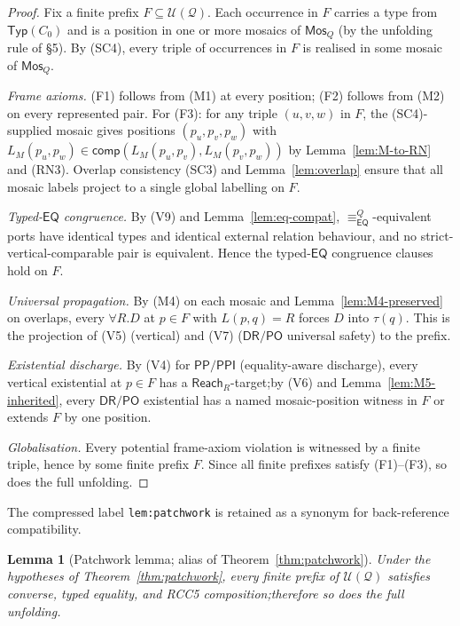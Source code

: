 \documentclass[11pt]{article}
\newtheorem{lemma}[theorem]{Lemma}
\newcommand{\EQ}{\mathsf{EQ}}
\newcommand{\DR}{\mathsf{DR}}
\newcommand{\PO}{\mathsf{PO}}
\newcommand{\PP}{\mathsf{PP}}
\newcommand{\PPI}{\mathsf{PPI}}
\newcommand{\comp}{\mathsf{comp}}
\newcommand{\Typ}{\mathsf{Typ}}
\newcommand{\Q}{\mathcal Q}
\newcommand{\U}{\mathcal U}
\newcommand{\Mos}{\mathsf{Mos}}
\newcommand{\Reach}{\mathrel{\mathsf{Reach}}}
\newcommand{\eqc}{\equiv_{\EQ}}
\begin{document}
\begin{proof}
Fix a finite prefix $F\subseteq\U(\Q)$.  Each occurrence in $F$
carries a type from $\Typ(C_0)$ and is a position in one or more
mosaics of $\Mos_Q$ (by the unfolding rule of \S5).  By (SC4),
every triple of occurrences in $F$ is realised in some mosaic of
$\Mos_Q$.

\emph{Frame axioms.}  (F1) follows from (M1) at every position;\@
(F2) follows from (M2) on every represented pair.  For (F3): for any
triple $(u,v,w)$ in $F$, the (SC4)-supplied mosaic gives positions
$(p_u,p_v,p_w)$ with
$L_M(p_u,p_w)\in\comp(L_M(p_u,p_v),L_M(p_v,p_w))$ by
Lemma~\ref{lem:M-to-RN} and (RN3).  Overlap consistency (SC3) and
Lemma~\ref{lem:overlap} ensure that all mosaic labels project to a
single global labelling on $F$.

\emph{Typed-$\EQ$ congruence.}  By (V9) and
Lemma~\ref{lem:eq-compat}, $\eqc^{Q}$-equivalent ports have
identical types and identical external relation behaviour, and no
strict-vertical-comparable pair is equivalent.  Hence the typed-$\EQ$
congruence clauses hold on $F$.

\emph{Universal propagation.}  By (M4) on each mosaic and
Lemma~\ref{lem:M4-preserved} on overlaps, every $\forall R.D$ at
$p\in F$ with $L(p,q)=R$ forces $D$ into $\tau(q)$.  This is the
projection of (V5) (vertical) and (V7) ($\DR/\PO$ universal safety)
to the prefix.

\emph{Existential discharge.}  By (V4) for $\PP/\PPI$ (equality-aware
discharge), every vertical existential at $p\in F$ has a
$\Reach_R$-target;\@ by (V6) and Lemma~\ref{lem:M5-inherited}, every
$\DR/\PO$ existential has a named mosaic-position witness in $F$ or
extends $F$ by one position.

\emph{Globalisation.}  Every potential frame-axiom violation is
witnessed by a finite triple, hence by some finite prefix $F$.  Since
all finite prefixes satisfy (F1)--(F3), so does the full unfolding.
\end{proof}

The compressed label \texttt{lem:patchwork} is retained as a synonym
for back-reference compatibility.

\begin{lemma}[Patchwork lemma; alias of Theorem~\ref{thm:patchwork}]\label{lem:patchwork}
Under the hypotheses of Theorem~\ref{thm:patchwork}, every finite
prefix of $\U(\Q)$ satisfies converse, typed equality, and RCC5
composition;\@ therefore so does the full unfolding.
\end{lemma}
\end{document}

